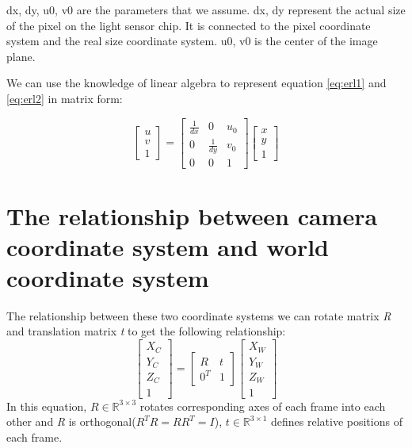 dx, dy, u0, v0 are the parameters that we assume. dx, dy represent the actual size of the pixel on the light sensor chip. It is connected to the pixel coordinate system and the real size coordinate system. u0, v0 is the center of the image plane.

We can use the knowledge of linear algebra to represent equation \eqref{eq:erl1} and \eqref{eq:erl2} in matrix form:

\begin{equation}\label{eq:erl3}
\begin{bmatrix} u \\ v \\ 1 \end{bmatrix}
      = \begin{bmatrix} \frac{1}{dx} & 0 & u_0\\
                        0 & \frac{1}{dy} & v_0\\
                        0 & 0 & 1 \end{bmatrix}
        \begin{bmatrix} x \\ y \\1 \end{bmatrix}                 
\end{equation}

\section{The relationship between camera coordinate system and world coordinate system}

The relationship between these two coordinate systems we can rotate matrix \textit{R} and translation matrix \textit{t} to get the following relationship:
\begin{equation}\label{eq:erl4}
\begin{bmatrix} X_C \\ Y_C \\ Z_C \\ 1 \end{bmatrix}
      = \begin{bmatrix} R & t \\
                        0^T & 1 \end{bmatrix}
        \begin{bmatrix} X_W \\ Y_W \\ Z_W \\ 1 \end{bmatrix}                 
\end{equation}
In this equation, $R \in \mathbb{R}^{3\times3}$ rotates corresponding axes of each frame into each other and \textit{R} is orthogonal($R^TR = RR^T = I$), $t \in \mathbb{R}^{3\times1}$ defines relative positions of each frame.

